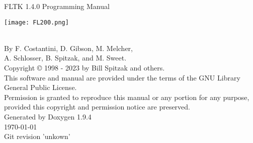 %
%
\begin{titlepage}
\vspace*{5cm}
\begin{center}%
{\Huge FLTK 1.4.0 Programming Manual}\\
\vspace*{2cm}
\begin{DoxyImageNoCaption}
 \mbox{\texttt{[image: FL200.png]}}
\end{DoxyImageNoCaption}\\
\vspace*{2cm}
{\Large
By F. Costantini, D. Gibson, M. Melcher, \\
A. Schlosser, B. Spitzak, and M. Sweet.}\\
\vspace*{1.5cm}
{\large Copyright © 1998 - 2023
 by Bill Spitzak and others.}\\
\vspace*{0.75cm}
{\small
This software and manual are provided under the terms of the GNU Library General Public License.}\\
{\small
Permission is granted to reproduce this manual or any portion for any purpose,}\\
{\small
provided this copyright and permission notice are preserved.}\\
\vspace*{1.5cm}
{\large Generated by Doxygen 1.9.4}\\
\vspace*{0.5cm}
\today{}\\
\vspace*{0.5cm}
{\small Git revision 'unkown'}\\
\end{center}
\end{titlepage}
%
%
